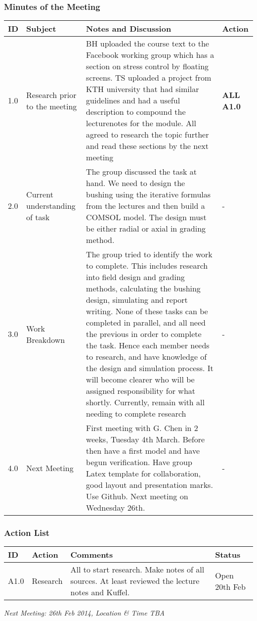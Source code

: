 \subsubsection{Minutes of the Meeting}
\begin{center}
\begin{longtable}{| p{} |>{\raggedright\arraybackslash}p{} | p{} |>{\raggedright\arraybackslash}p{}|} \hline
\textbf{ID} & \textbf{Subject} & \textbf{Notes and Discussion} & \textbf{Action} \\ \hline
\endhead
1.0	&	Research prior to the meeting	&	BH uploaded the course text to the Facebook working group which has a section on stress control by floating screens. TS uploaded a project from KTH university that had similar guidelines and had a useful description to compound the lecturenotes for the module. All agreed to research the topic further and read these sections by the next meeting	&  \textbf{ALL A1.0}	 \\ \hline
2.0	&	Current understanding of task	&	The group discussed the task at hand. We need to design the bushing using the iterative formulas from the lectures and then build a COMSOL model. The design must be either radial or axial in grading method.	& -	 \\ \hline
3.0 	& 	Work Breakdown &	The group tried to identify the work to complete. This includes research into field design and grading methods, calculating the bushing design, simulating and report writing. None of these tasks can be completed in parallel, and all need the previous in order to complete the task. Hence each member needs to research, and have knowledge of the design and simulation process. It will become clearer who will be assigned responsibility for what shortly. Currently, remain with all needing to complete research & - \\ \hline
4.0	&	Next Meeting	&	First meeting with G. Chen in 2 weeks, Tuesday 4th March. Before then have a first model and have begun verification. Have group Latex template for collaboration, good layout and presentation marks. Use Github. Next meeting on Wednesday 26th. & - \\ \hline

\end{longtable}
\end{center}

\subsubsection{Action List}
\begin{center}
\begin{longtable}{| p{} | >{\raggedright\arraybackslash}p{} |  p{} | >{\raggedright\arraybackslash}p{}|} \hline
\textbf{ID} & \textbf{Action} & \textbf{Comments} & \textbf{Status} \\ \hline
\endhead
A1.0	&	Research	&	All to start research. Make notes of all sources. At least reviewed the lecture notes and Kuffel.	& Open 20th Feb \\ \hline	
\end{longtable}
\end{center}

\emph{Next Meeting: 26th Feb 2014, Location \& Time TBA}